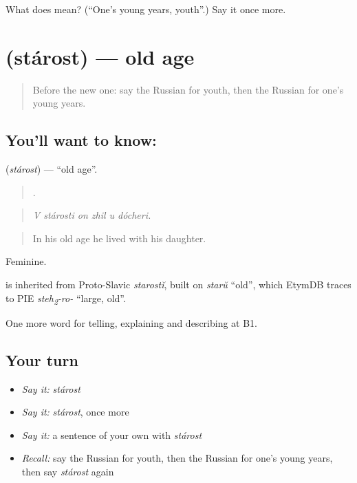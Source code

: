 \begin{tcolorbox}[breakable,colback=teal!4,colframe=teal!35!black,title={Before you move on}]
What does  mean? (\textquotedblleft{}One's young years, youth\textquotedblright{}.) Say it once more.
\end{tcolorbox}
\section[\texorpdfstring{\ru{старость} (stárost)}{старость (stárost)}]{ (stárost) — old age}

\label{lesson:RU-C304-starost}



\begin{quote}
Before the new one: say the Russian for youth, then the Russian for one's young years.
\end{quote}

\subsection*{You'll want to know: }
\textbf{} (\emph{stárost}) — \textquotedblleft{}old age\textquotedblright{}.

\begin{quote}
     .
\end{quote}

\begin{quote}
\emph{V stárosti on zhil u dócheri.}
\end{quote}

\begin{quote}
In his old age he lived with his daughter.
\end{quote}

Feminine.

\begin{cousinweb}
\emph{} is inherited from Proto-Slavic \emph{starostĭ}, built on \emph{starŭ} \textquotedblleft{}old\textquotedblright{}, which EtymDB traces to PIE \emph{steh\textsubscript{2}-ro-} \textquotedblleft{}large, old\textquotedblright{}.
\end{cousinweb}

\begin{grammarlens}[title={What you've built}]
One more word for telling, explaining and describing at B1.
\end{grammarlens}

\subsection*{Your turn}
\begin{itemize}
\raggedright
  \item \emph{Say it:} \emph{stárost}
  \item \emph{Say it:} \emph{stárost}, once more
  \item \emph{Say it:} a sentence of your own with \emph{stárost}
  \item \emph{Recall:} say the Russian for youth, then the Russian for one's young years, then say \emph{stárost} again
\end{itemize}

